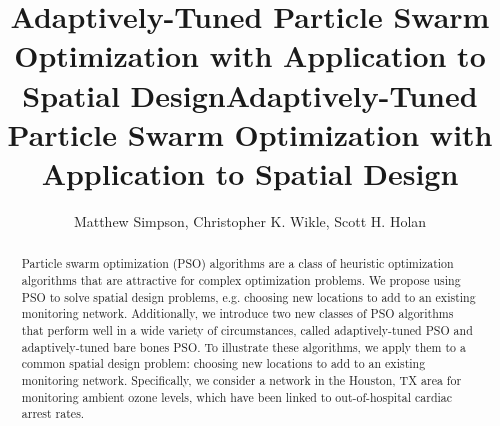 \documentclass[cmbright]{staauth}
\begin{document}
\blind
{
  \title{Adaptively-Tuned Particle Swarm Optimization with Application to Spatial Design}
  \author{Matthew Simpson\corrauth, Christopher K. Wikle, Scott H. Holan}
  \address{Department of Statistics, University of Missouri, 146 Middlebush Hall, Columbia, MO 65211-6100\\
U.S. Census Bureau, 4600 Silver Hill Road, Washington, D.C. 20233-9100}
}\fi

\blind
{
  \title{Adaptively-Tuned Particle Swarm Optimization with Application to Spatial Design}
  \author{}
  \address{}
  \corremail{}
  \received{}
  \accepted{}
}\fi
\begin{abstract}
Particle swarm optimization (PSO) algorithms are a class of heuristic optimization algorithms that are attractive for complex optimization problems. We propose using PSO to solve spatial design problems, e.g. choosing new locations to add to an existing monitoring network. Additionally, we introduce two new classes of PSO algorithms that perform well in a wide variety of circumstances, called adaptively-tuned PSO and adaptively-tuned bare bones PSO. To illustrate these algorithms, we apply them to a common spatial design problem: choosing new locations to add to an existing monitoring network. Specifically, we consider a network in the Houston, TX area for monitoring ambient ozone levels, which have been linked to out-of-hospital cardiac arrest rates.
\end{abstract}
\maketitle
\end{document}
